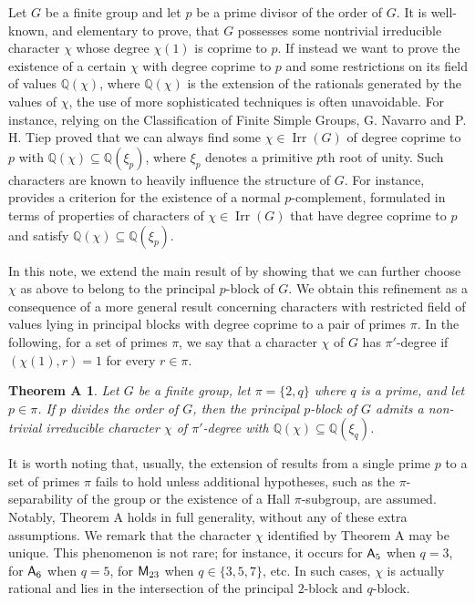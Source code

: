 \documentclass[a4paper,12pt,leqno]{amsart}
\def\irr#1{{\Irr}(#1)}
\def\sbs{\subseteq}
\newcommand{\6}{^}
\newcommand{\Irr}{\operatorname{Irr}}
\newtheorem*{thmA}{Theorem A}
\theoremstyle{definition}
\theoremstyle{definition}
\theoremstyle{definition}
\theoremstyle{definition}
\theoremstyle{definition}
\def\Q{\mathbb Q}
\begin{document}
Let $G$ be a finite group and let $p$ be a prime divisor of the order of $G$. It is well-known, and elementary to prove, that $G$ possesses some nontrivial irreducible character $\chi$ whose degree $\chi(1)$ is coprime to $p$. 
If instead we want to prove the existence of a certain $\chi$ with degree coprime to $p$ and some restrictions on its field of values $\Q(\chi)$, where $\Q(\chi)$ is the extension of the rationals generated by the values of $\chi$, the use of more sophisticated techniques is often unavoidable. For instance, relying on the Classification of Finite Simple Groups, G. Navarro and P. H. Tiep \cite{NT06, NT08} proved that we can always
find some $\chi \in \irr G$ of degree coprime to $p$ with $\Q(\chi)\sbs \Q(\xi_p)$, where $\xi_p$ denotes a primitive $p$th root of unity.  
Such characters are known to heavily influence the structure of $G$. 
For instance,  \cite[Theorem C]{NT10} provides a criterion for the existence of a normal $p$-complement, 
formulated in terms of properties of characters
of  $\chi \in \irr G$ that have degree coprime to $p$ and satisfy $\Q(\chi)\sbs \Q(\xi_p)$.


In this note, we extend the main result of \cite{NT06} by showing that we can further choose $\chi$ as above to belong to the principal $p$-block of $G$. 
We obtain this refinement as a consequence of a more general result concerning characters with restricted field of values lying in principal blocks with degree coprime to a pair of primes $\pi$. 
In the following, for a set of primes $\pi$, we say that a character $\chi$ of $G$ has $\pi'$-degree if $(\chi(1), r)=1$ for every $r \in \pi$.


\begin{thmA} 
Let $G$ be a finite group, let $\pi=\{ 2, q \}$ where $q$ is a prime, and let $p\in \pi$. If $p$ divides the order of $G$, then the principal $p$-block of $G$ admits a non-trivial irreducible character $\chi$ of $\pi'$-degree with $\Q(\chi)\sbs \Q(\xi_q)$.
\end{thmA}

It is worth noting that, usually, the extension of results from a single prime $p$ to a set of primes $\pi$ fails to hold unless additional hypotheses, such as the $\pi$-separability of the group or the existence of a Hall $\pi$-subgroup, are assumed.
Notably, Theorem A holds in full generality, without any of these extra assumptions. We remark that the character $\chi$ identified by Theorem A may be unique. This phenomenon is not rare; for instance, it occurs for ${\sf A}_5$ when $q=3$, for ${\sf A}_6$ when $q=5$, for ${\sf M}_{23}$  when $q \in \{ 3, 5 , 7\}$, etc. In such cases, $\chi$ is actually rational and lies in the intersection of the principal $2$-block and $q$-block. 
\end{document}
